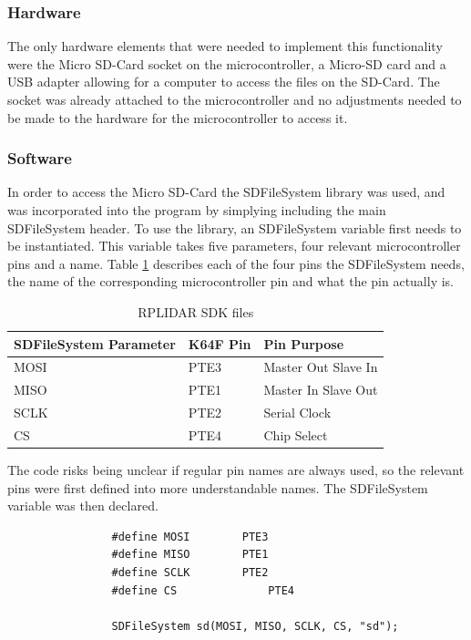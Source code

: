 				\subsubsection{Hardware}
				The only hardware elements that were needed to implement this functionality were the Micro SD-Card socket on the microcontroller, a Micro-SD card and a USB adapter allowing for a computer to access the files on the SD-Card. The socket was already attached to the microcontroller and no adjustments needed to be made to the hardware for the microcontroller to access it.
				
				\subsubsection{Software}
				In order to access the Micro SD-Card the SDFileSystem library was used, and was incorporated into the program by simplying including the main SDFileSystem header. To use the library, an SDFileSystem variable first needs to be instantiated. This variable takes five parameters, four relevant microcontroller pins and a name. Table \ref{table:sdfilesystempins} describes each of the four pins the SDFileSystem needs, the name of the corresponding microcontroller pin and what the pin actually is.
	
				\begin{table}[h!]
					\centering
					\begin{tabular}{|| l | l | l ||} 
						\hline
						SDFileSystem Parameter & K64F Pin & Pin Purpose \\ [0.5ex] 
						\hline
						MOSI  & PTE3 & Master Out Slave In \\ 
						MISO  & PTE1  & Master In Slave Out \\
						SCLK  & PTE2 & Serial Clock \\
						CS & PTE4 & Chip Select \\ [1ex] 
						\hline
					\end{tabular}
					\caption{RPLIDAR SDK files}
					\label{table:sdfilesystempins}
				\end{table}
			
				The code risks being unclear if regular pin names are always used, so the relevant pins were first defined into more understandable names. The SDFileSystem variable was then declared.
				
				\begin{lstlisting}
				#define MOSI		PTE3
				#define MISO		PTE1
				#define	SCLK		PTE2
				#define	CS				PTE4
				
				SDFileSystem sd(MOSI, MISO, SCLK, CS, "sd");
				\end{lstlisting}
				
